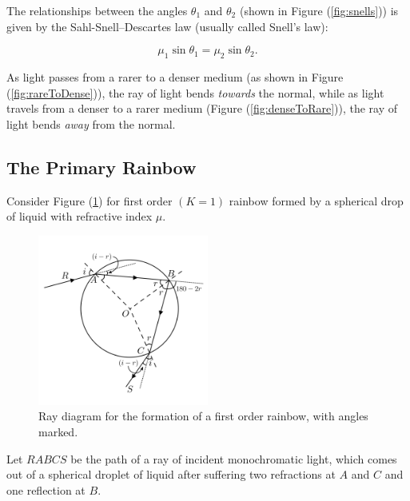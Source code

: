 \begin{refsection}
The relationships between the angles $\theta_1$ and $\theta_2$ (shown in Figure (\ref{fig:snells})) is given by the Sahl-Snell–Descartes law (usually called Snell's law):

 \begin{equation}
    \mu_1 \sin{\theta_1}= \mu_2 \sin{\theta_2}.
    \label{snell}
 \end{equation}

As light passes from a rarer to a denser medium (as shown in Figure (\ref{fig:rareToDense})), the ray of light bends \textit{towards} the normal, while as light travels from a denser to a rarer medium (Figure (\ref{fig:denseToRare})), the ray of light bends \textit{away} from the normal. 



\subsection*{The Primary Rainbow}

Consider Figure (\ref{fig:firstOrder}) for first order $(K = 1)$ rainbow formed by a spherical drop of liquid with refractive index $\mu$.

\begin{figure}[!htb]
    \centering
    \includegraphics[width=0.5\textwidth]{figs/rainbow1.png}
    \caption{Ray diagram for the formation of a first order rainbow, with angles marked.}
    \label{fig:firstOrder}
\end{figure}


Let $RABCS$ be the path of a ray of incident monochromatic light, which comes out of a spherical droplet of liquid after suffering two refractions at $A$ and $C$ and one reflection at $B$.


\end{refsection}
